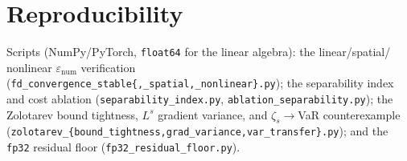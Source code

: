 \documentclass[11pt]{article}
\begin{document}
\section{Reproducibility}
Scripts (NumPy/PyTorch, \texttt{float64} for the linear algebra): the linear/spatial/
nonlinear $\varepsilon_{\mathrm{num}}$ verification
(\texttt{fd\_convergence\_stable\{,\_spatial,\_nonlinear\}.py}); the separability index and
cost ablation (\texttt{separability\_index.py}, \texttt{ablation\_separability.py}); the
Zolotarev bound tightness, $L^s$ gradient variance, and $\zeta_s\!\to\!$VaR counterexample
(\texttt{zolotarev\_\{bound\_tightness,grad\_variance,var\_transfer\}.py}); and the
\texttt{fp32} residual floor (\texttt{fp32\_residual\_floor.py}).
\end{document}
